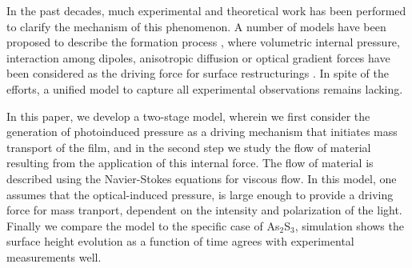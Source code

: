 \documentclass[aps, prl, twocolumn, groupedaddress]{revtex4-1}
\begin{document}
In the past decades, much experimental and theoretical work has been
performed to clarify the mechanism of this phenomenon. A number of
models have been proposed to describe the formation process
\cite{saliminia, hisakuni95}, where volumetric internal pressure,
interaction among dipoles, anisotropic diffusion or optical gradient
forces have been considered as the driving force for surface
restructurings \cite{Kumar:1998je, Bian:1999ic, Lefin:1999fm}. In
spite of the efforts, a unified model to capture all experimental
observations remains lacking.


In this paper, we develop a two-stage model, wherein we first consider
the generation of photoinduced pressure as a driving mechanism that
initiates mass transport of the film, and in the second step we study
the flow of material resulting from the application of this internal
force. The flow of material is described using the Navier-Stokes
equations for viscous flow. In this model, one assumes that the
optical-induced pressure, is large enough to provide a driving force
for mass tranport, dependent on the intensity and polarization of the
light. Finally we compare the model to the specific case of
As$_2$S$_3$, simulation shows the surface height evolution as a
function of time agrees with experimental measurements well.
\end{document}
